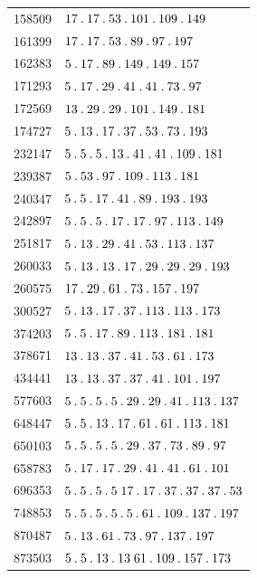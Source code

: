 \begin{longtable}{@{}r|l@{}}
158509 & $17\pdot 17\pdot 53\pdot 101\pdot 109\pdot 149$\\
161399 & $17\pdot 17\pdot 53\pdot 89\pdot 97\pdot 197$\\
162383 & $5\pdot 17\pdot 89\pdot 149\pdot 149\pdot 157$\\
171293 & $5\pdot 17\pdot 29\pdot 41\pdot 41\pdot 73\pdot 97$\\
172569 & $13\pdot 29\pdot 29\pdot 101\pdot 149\pdot 181$\\
174727 & $5\pdot 13\pdot 17\pdot 37\pdot 53\pdot 73\pdot 193$\\
232147 & $5\pdot 5\pdot 5\pdot 13\pdot 41\pdot 41\pdot 109\pdot 181$\\
239387 & $5\pdot 53\pdot 97\pdot 109\pdot 113\pdot 181$\\
240347 & $5\pdot 5\pdot 17\pdot 41\pdot 89\pdot 193\pdot 193$\\
242897 & $5\pdot 5\pdot 5\pdot 17\pdot 17\pdot 97\pdot 113\pdot 149$\\
251817 & $5\pdot 13\pdot 29\pdot 41\pdot 53\pdot 113\pdot 137$\\
260033 & $5\pdot 13\pdot 13\pdot 17\pdot 29\pdot 29\pdot 29\pdot 193$\\
260575 & $17\pdot 29\pdot 61\pdot 73\pdot 157\pdot 197$\\
300527 & $5\pdot 13\pdot 17\pdot 37\pdot 113\pdot 113\pdot 173$\\
374203 & $5\pdot 5\pdot 17\pdot 89\pdot 113\pdot 181\pdot 181$\\
378671 & $13\pdot 13\pdot 37\pdot 41\pdot 53\pdot 61\pdot 173$\\
434441 & $13\pdot 13\pdot 37\pdot 37\pdot 41\pdot 101\pdot 197$\\
577603 & $5\pdot 5\pdot 5\pdot 5\pdot 29\pdot 29\pdot 41\pdot 113\pdot 137$\\
648447 & $5\pdot 5\pdot 13\pdot 17\pdot 61\pdot 61\pdot 113\pdot 181$\\
650103 & $5\pdot 5\pdot 5\pdot 5\pdot 29\pdot 37\pdot 73\pdot 89\pdot 97$\\
658783 & $5\pdot 17\pdot 17\pdot 29\pdot 41\pdot 41\pdot 61\pdot 101$\\
696353 & $5\pdot 5\pdot 5\pdot 5\;17\pdot 17\pdot 37\pdot 37\pdot 37\pdot 53$\\
748853 & $5\pdot 5\pdot 5\pdot 5\pdot 5\pdot 61\pdot 109\pdot 137\pdot 197$\\
870487 & $5\pdot 13\pdot 61\pdot 73\pdot 97\pdot 137\pdot 197$\\
873503 & $5\pdot 5\pdot 13\pdot 13\;61\pdot 109\pdot 157\pdot 173$\\

\end{longtable}
